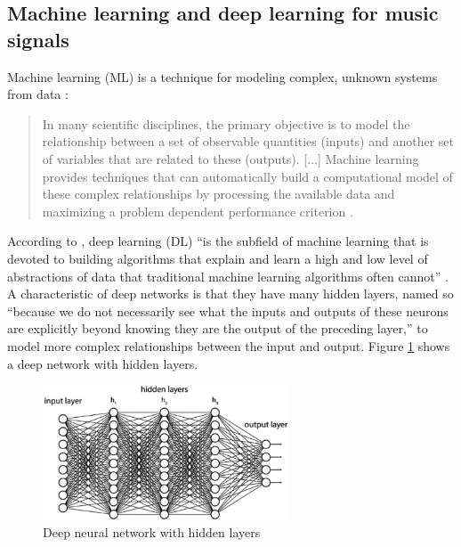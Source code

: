 \documentclass[report.tex]{subfiles}
\begin{document}
\newpagefill

\subsection{Machine learning and deep learning for music signals}
\label{sec:ml}

Machine learning (ML) is a technique for modeling complex, unknown systems from data \parencite{introtoml}:

\begin{quote}
	In many scientific disciplines, the primary objective is to model the relationship between a set of observable quantities (inputs) and another set of variables that are related to these (outputs). [...] Machine learning provides techniques that can automatically build a computational model of these complex relationships by processing the available data and maximizing a problem dependent performance criterion \parencite[105]{introtoml}.
\end{quote}

According to \citeauthor{introtodl}, deep learning (DL) ``is the subfield of machine learning that is devoted to building algorithms that explain and learn a high and low level of abstractions of data that traditional machine learning algorithms often cannot'' \parencite[1]{introtodl}. A characteristic of deep networks is that they have many hidden layers, named so ``because we do not necessarily see what the inputs and outputs of these neurons are explicitly beyond knowing they are the output of the preceding layer,'' \parencite[2]{introtodl} to model more complex relationships between the input and output. Figure \ref{fig:fcdn} shows a deep network with hidden layers.

\begin{figure}[ht]
	\centering
	\includegraphics[width=0.65\textwidth]{./images-neural/dnn.png}
	\caption{Deep neural network with hidden layers \parencite[2]{introtodl}}
	\label{fig:fcdn}
\end{figure}
\end{document}

